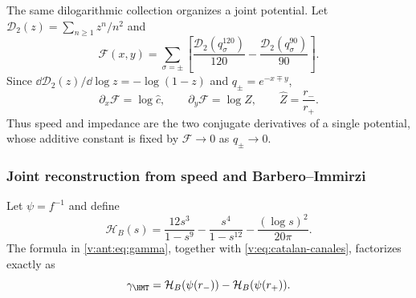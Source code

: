 The same dilogarithmic collection organizes a joint potential. Let
$\mathcal D_2(z)=\sum_{n\geq1}z^n/n^2$ and
\begin{equation}
 \mathscr F(x,y)=\sum_{\sigma=\pm}
 \left[
 \frac{\mathcal D_2(q_\sigma^{120})}{120}
 -\frac{\mathcal D_2(q_\sigma^{90})}{90}
 \right].
 \label{v:eq:potencial-constitutivo-catalan}
\end{equation}
Since $\dd\mathcal D_2(z)/\dd\log z=-\log(1-z)$ and
$q_\pm=e^{-x\mp y}$,
\begin{equation}
 \partial_x\mathscr F=\log\widehat c,
 \qquad
 \partial_y\mathscr F=\log\widehat Z,
 \qquad \widehat Z=\frac{r_-}{r_+}.
 \label{v:eq:gradiente-constitutivo-catalan}
\end{equation}
Thus speed and impedance are the two conjugate derivatives of a single
potential, whose additive constant is fixed by $\mathscr F\to0$ as
$q_\pm\to0$.

\subsubsection{Joint reconstruction from speed and Barbero--Immirzi}

Let $\psi=f^{-1}$ and define
\begin{equation}
 \mathcal H_B(s)=\frac{12s^3}{1-s^9}
 -\frac{s^4}{1-s^{12}}-\frac{(\log s)^2}{20\pi}.
 \label{v:eq:funcional-barbero-espectral}
\end{equation}
The formula in \eqref{v:ant:eq:gamma}, together with
\eqref{v:eq:catalan-canales}, factorizes exactly as
\begin{equation}
 \gamma_{\HMT}=\mathcal H_B(\psi(r_-))
 -\mathcal H_B(\psi(r_+)).
 \label{v:eq:factorizacion-barbero-espectral}
\end{equation}

